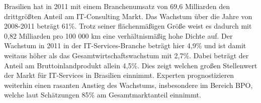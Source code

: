\begin{itemize}
Brasilien hat in 2011 mit einem Branchenumsatz von 69,6 Milliarden den drittgrößten Anteil am IT-Consulting Markt. Das Wachstum über die Jahre von 2008-2011 beträgt 61\%. \cite{statBras2} Trotz seiner flächenmäßigen Größe weist es dadurch mit 0,82 Milliarden pro 100 000 km eine verhältnismäßig hohe Dichte auf. Der Wachstum in 2011 in der IT-Services-Branche beträgt hier 4,9\% und ist damit weitaus höher als das Gesamtwirtschaftswachstum mit 2,7\%. Dabei beträgt der Anteil am Bruttoinlandprodukt allein 4,5\%. Dies zeigt welchen großen Stellenwert der Markt für IT-Services in Brasilien einnimmt. Experten prognostizieren weiterhin einen rasanten Anstieg des Wachstums, insbesondere im Bereich BPO, welche laut Schätzungen 85\% am Gesamtmarktanteil einnimmt.\cite{statBras}


\end{itemize}


